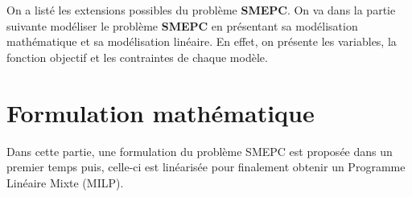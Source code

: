 {	

On a listé les extensions possibles du problème \textbf{SMEPC}. On va dans la partie suivante modéliser le problème \textbf{SMEPC} en présentant sa modélisation mathématique et sa modélisation linéaire. En effet, on présente les variables, la fonction objectif et les contraintes de chaque modèle. }




\section{Formulation mathématique}
\label{modelisation_SMEPC}

Dans cette partie, une formulation  du problème SMEPC est proposée dans un premier temps puis, celle-ci est linéarisée pour finalement obtenir un Programme Linéaire Mixte (MILP). %

